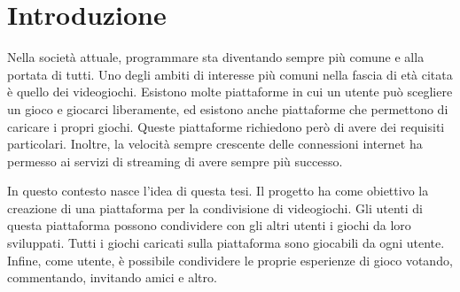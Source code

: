 \chapter{Introduzione}

Nella società attuale, programmare sta diventando sempre più comune e
alla portata di tutti.
Uno degli ambiti di interesse più comuni nella fascia di età citata è
quello dei videogiochi. Esistono molte piattaforme in cui un utente
può scegliere un gioco e giocarci liberamente, ed esistono anche
piattaforme che permettono di caricare i propri giochi. Queste
piattaforme richiedono però di avere dei requisiti particolari.
Inoltre, la velocità sempre crescente delle connessioni internet ha
permesso ai servizi di streaming di avere sempre più successo.

In questo contesto nasce l'idea di questa tesi.
Il progetto ha come obiettivo la creazione di una piattaforma per la
condivisione di videogiochi. Gli utenti di questa piattaforma possono
condividere con gli altri utenti i giochi da loro sviluppati. Tutti i
giochi caricati sulla piattaforma sono giocabili da ogni utente.
Infine, come utente, è possibile condividere le proprie esperienze di
gioco votando, commentando, invitando amici e altro.
